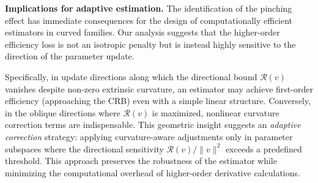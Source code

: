\documentclass[pdflatex,sn-mathphys-num]{sn-jnl}%
\theoremstyle{thmstyleone}%
\theoremstyle{thmstyletwo}%
\theoremstyle{thmstylethree}%
\begin{document}
\noindent
\textbf{Implications for adaptive estimation.}
The identification of the pinching effect has immediate consequences for the design of computationally efficient estimators in curved families. Our analysis suggests that the higher-order efficiency loss is not an isotropic penalty but is instead highly sensitive to the direction of the parameter update. 

Specifically, in update directions along which the directional bound $\mathcal{R}(v)$ vanishes despite non-zero extrinsic curvature, an estimator may achieve first-order efficiency (approaching the CRB) even with a simple linear structure. Conversely, in the oblique directions where $\mathcal{R}(v)$ is maximized, nonlinear curvature correction terms are indispensable. This geometric insight suggests an \textit{adaptive correction} strategy: applying curvature-aware adjustments only in parameter subspaces where the directional sensitivity $\mathcal{R}(v)/\|v\|^2$ exceeds a predefined threshold. This approach preserves the robustness of the estimator while minimizing the computational overhead of higher-order derivative calculations.
\end{document}
